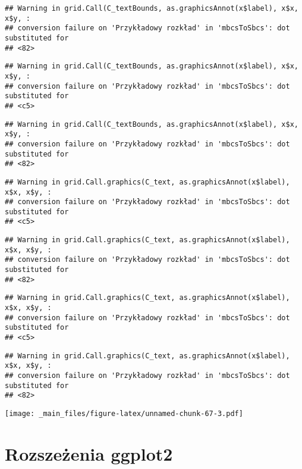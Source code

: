 \documentclass[
]{book}
\begin{document}
\begin{verbatim}
## Warning in grid.Call(C_textBounds, as.graphicsAnnot(x$label), x$x, x$y, :
## conversion failure on 'Przykładowy rozkład' in 'mbcsToSbcs': dot substituted for
## <82>
\end{verbatim}

\begin{verbatim}
## Warning in grid.Call(C_textBounds, as.graphicsAnnot(x$label), x$x, x$y, :
## conversion failure on 'Przykładowy rozkład' in 'mbcsToSbcs': dot substituted for
## <c5>
\end{verbatim}

\begin{verbatim}
## Warning in grid.Call(C_textBounds, as.graphicsAnnot(x$label), x$x, x$y, :
## conversion failure on 'Przykładowy rozkład' in 'mbcsToSbcs': dot substituted for
## <82>
\end{verbatim}

\begin{verbatim}
## Warning in grid.Call.graphics(C_text, as.graphicsAnnot(x$label), x$x, x$y, :
## conversion failure on 'Przykładowy rozkład' in 'mbcsToSbcs': dot substituted for
## <c5>
\end{verbatim}

\begin{verbatim}
## Warning in grid.Call.graphics(C_text, as.graphicsAnnot(x$label), x$x, x$y, :
## conversion failure on 'Przykładowy rozkład' in 'mbcsToSbcs': dot substituted for
## <82>
\end{verbatim}

\begin{verbatim}
## Warning in grid.Call.graphics(C_text, as.graphicsAnnot(x$label), x$x, x$y, :
## conversion failure on 'Przykładowy rozkład' in 'mbcsToSbcs': dot substituted for
## <c5>
\end{verbatim}

\begin{verbatim}
## Warning in grid.Call.graphics(C_text, as.graphicsAnnot(x$label), x$x, x$y, :
## conversion failure on 'Przykładowy rozkład' in 'mbcsToSbcs': dot substituted for
## <82>
\end{verbatim}

\texttt{[image: \_main\_files/figure-latex/unnamed-chunk-67-3.pdf]}

\hypertarget{rozszeux17cenia-ggplot2}{%
\section{Rozszeżenia ggplot2}\label{rozszeux17cenia-ggplot2}}
\end{document}
